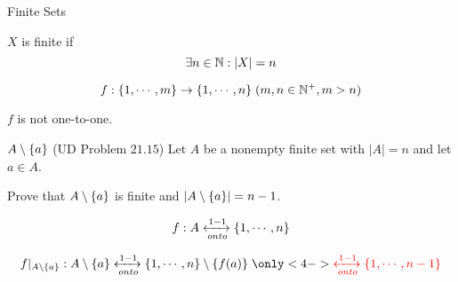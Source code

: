 \begin{frame}{}
  \centerline{\LARGE Finite Sets}

  \vspace{0.50cm}

  \pause
  \begin{quote}
    \begin{center}
      {\large {}}
    \end{center}
  \end{quote}
\end{frame}


\begin{frame}{}
  \begin{definition}[Finite]
    $X$ is finite if
    \[
      \exists n \in \mathbb{N}: |X| = n
    \]
  \end{definition}

  \pause
  \vspace{0.60cm}
  \begin{theorem}
    \[
      f: \{1, \cdots, m\} \to \{1, \cdots, n\} \; (m,n \in \mathbb{N}^{+}, m > n)
    \]

    $f$ is not one-to-one.
  \end{theorem}
\end{frame}

\begin{frame}{}
  \begin{exampleblock}{$A \setminus \{a\}$ (UD Problem $21.15$)}
    Let $A$ be a nonempty finite set with $|A| = n$ and let $a \in A$.

    Prove that $A \setminus \{a\}$ is finite and $|A \setminus \{a\}| = n - 1$.
  \end{exampleblock}

  \pause
  \[
    f: A \xleftrightarrow[onto]{1-1} \{1, \cdots, n\}
  \]

  \pause
  \[
    f|_{A \setminus \set{a}}: A \setminus \set{a} \xleftrightarrow[onto]{1-1} \set{1, \cdots, n} \setminus \set{f(a)} \;
    \only<4->{\red{\xleftrightarrow[onto]{1-1} \set{1, \cdots, n - 1}}}
  \]
\end{frame}

